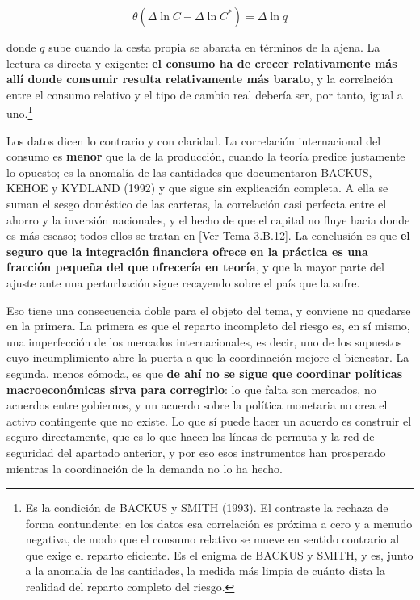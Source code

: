 \documentclass[10pt,a4paper]{article}
\newcommand{\authorfont}[1]{{\fontfamily{EBGaramond-TLF}\selectfont #1}}
\begin{document}
$$\theta\left(\Delta\ln C-\Delta\ln C^{*}\right)=\Delta\ln q$$

donde $q$ sube cuando la cesta propia se abarata en términos de la ajena. La lectura es directa y exigente: \textbf{el consumo ha de crecer relativamente más allí donde consumir resulta relativamente más barato}, y la correlación entre el consumo relativo y el tipo de cambio real debería ser, por tanto, igual a uno.\footnote{%
    Es la condición de BACKUS y SMITH (1993). El contraste la rechaza de forma contundente: en los datos esa correlación es próxima a cero y a menudo negativa, de modo que el consumo relativo se mueve en sentido contrario al que exige el reparto eficiente. Es el enigma de BACKUS y SMITH, y es, junto a la anomalía de las cantidades, la medida más limpia de cuánto dista la realidad del reparto completo del riesgo.
}

Los datos dicen lo contrario y con claridad. La correlación internacional del consumo es \textbf{menor} que la de la producción, cuando la teoría predice justamente lo opuesto; es la anomalía de las cantidades que documentaron BACKUS, KEHOE y KYDLAND (1992) y que sigue sin explicación completa. A ella se suman el sesgo doméstico de las carteras, la correlación casi perfecta entre el ahorro y la inversión nacionales, y el hecho de que el capital no fluye hacia donde es más escaso; todos ellos se tratan en [\authorfont{Ver Tema 3.B.12}]. La conclusión es que \textbf{el seguro que la integración financiera ofrece en la práctica es una fracción pequeña del que ofrecería en teoría}, y que la mayor parte del ajuste ante una perturbación sigue recayendo sobre el país que la sufre.

Eso tiene una consecuencia doble para el objeto del tema, y conviene no quedarse en la primera. La primera es que el reparto incompleto del riesgo es, en sí mismo, una imperfección de los mercados internacionales, es decir, uno de los supuestos cuyo incumplimiento abre la puerta a que la coordinación mejore el bienestar. La segunda, menos cómoda, es que \textbf{de ahí no se sigue que coordinar políticas macroeconómicas sirva para corregirlo}: lo que falta son mercados, no acuerdos entre gobiernos, y un acuerdo sobre la política monetaria no crea el activo contingente que no existe. Lo que sí puede hacer un acuerdo es construir el seguro directamente, que es lo que hacen las líneas de permuta y la red de seguridad del apartado anterior, y por eso esos instrumentos han prosperado mientras la coordinación de la demanda no lo ha hecho.
\end{document}
